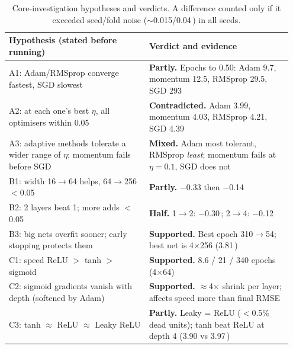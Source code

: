 \documentclass[10pt,a4paper]{article}
\newcommand{\A}{\,\text{\AA}}
\begin{document}
\begin{table}[H]
\centering\small
\begin{tabular}{@{}p{0.47\linewidth}p{0.48\linewidth}@{}}
\toprule
Hypothesis (stated before running) & Verdict and evidence \\
\midrule
A1: Adam/RMSprop converge fastest, SGD slowest & \textbf{Partly.} Epochs to 0.50: Adam 9.7, momentum 12.5, RMSprop 29.5, SGD 293 \\
A2: at each one's best $\eta$, all optimisers within 0.05\A & \textbf{Contradicted.} Adam 3.99, momentum 4.03, RMSprop 4.21, SGD 4.39\A \\
A3: adaptive methods tolerate a wider range of $\eta$; momentum fails before SGD & \textbf{Mixed.} Adam most tolerant, RMSprop \emph{least}; momentum fails at $\eta=0.1$, SGD does not \\
B1: width 16$\to$64 helps, 64$\to$256 $<$0.05\A & \textbf{Partly.} $-$0.33 then $-$0.14\A \\
B2: 2 layers beat 1; more adds $<$0.05\A & \textbf{Half.} 1$\to$2: $-$0.30\A; 2$\to$4: $-$0.12\A \\
B3: big nets overfit sooner; early stopping protects them & \textbf{Supported.} Best epoch 310$\to$54; best net is 4$\times$256 (3.81\A) \\
C1: speed ReLU $>$ tanh $>$ sigmoid & \textbf{Supported.} 8.6 / 21 / 340 epochs (4$\times$64) \\
C2: sigmoid gradients vanish with depth (softened by Adam) & \textbf{Supported.} $\approx$4$\times$ shrink per layer; affects speed more than final RMSE \\
C3: tanh $\approx$ ReLU $\approx$ Leaky ReLU & \textbf{Partly.} Leaky = ReLU ($<$0.5\% dead units); tanh beat ReLU at depth 4 (3.90 vs 3.97\A) \\
\bottomrule
\end{tabular}
\caption{Core-investigation hypotheses and verdicts. A difference counted only if it exceeded seed/fold noise ($\sim$0.015/0.04\A) in all seeds.}
\label{tab:core}
\end{table}
\end{document}
